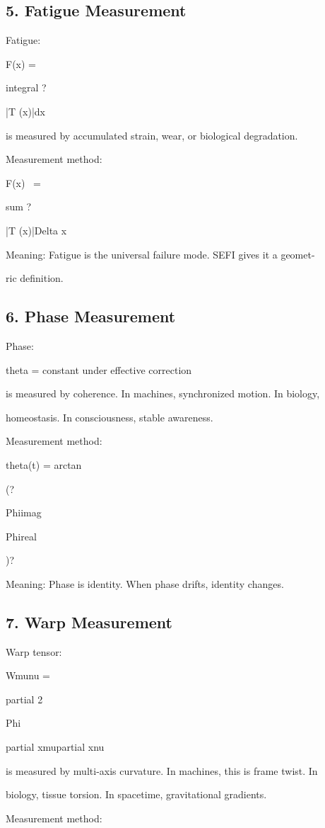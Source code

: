 \documentclass[10pt]{article}
\begin{document}
\subsection*{5. Fatigue Measurement}
Fatigue:

F(x) =

integral ?

|T (x)|dx

is measured by accumulated strain, wear, or biological degradation.

Measurement method:

F(x) ~=

sum ?

|T (x)|Delta x

Meaning: Fatigue is the universal failure mode. SEFI gives it a geomet-

ric definition.

\subsection*{6. Phase Measurement}
Phase:

theta = constant under effective correction

is measured by coherence. In machines, synchronized motion. In biology,

homeostasis. In consciousness, stable awareness.

Measurement method:

theta(t) = arctan

(?

Phiimag

Phireal

)?

Meaning: Phase is identity. When phase drifts, identity changes.

\subsection*{7. Warp Measurement}
Warp tensor:

Wmunu =

partial 2

Phi

partial xmupartial xnu


is measured by multi-axis curvature. In machines, this is frame twist. In

biology, tissue torsion. In spacetime, gravitational gradients.

Measurement method:
\end{document}
